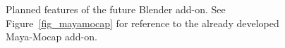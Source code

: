 \begin{figure}[hbtp]
      \centering
      \caption{Planned features of the future Blender add-on. See Figure~\ref{fig_mayamocap} for reference to the already developed Maya-Mocap add-on.}
      \label{fig_blendermocap}
\end{figure}




